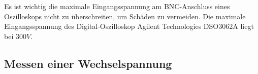 Es ist wichtig die maximale Eingangsspannung am BNC-Anschluss eines Oszilloskops nicht zu überschreiten, um Schäden zu vermeiden. Die maximale Eingangsspannung des Digital-Oszilloskop Agilent Technologies DSO3062A liegt bei $300V$.


\subsection*{Messen einer Wechselspannung}

\begin{figure}[H]
\centering
{}

\end{figure}
